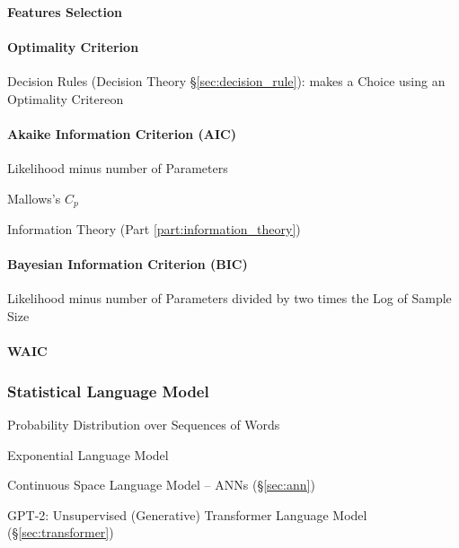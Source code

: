 \paragraph{Features Selection}\label{sec:feature_selection}\hfill

\paragraph{Optimality Criterion}\label{sec:optimality_criterion}\hfill

\fist Decision Rules (Decision Theory \S\ref{sec:decision_rule}): makes a
Choice using an Optimality Critereon



\paragraph{Akaike Information Criterion (AIC)}\label{sec:aic}\hfill

Likelihood minus number of Parameters

Mallows's $C_p$

\fist Information Theory (Part \ref{part:information_theory})



\paragraph{Bayesian Information Criterion (BIC)}\label{sec:bic}\hfill

Likelihood minus number of Parameters divided by two times the Log of Sample
Size



\paragraph{WAIC}\label{sec:waic}\hfill



\subsubsection{Statistical Language Model}
\label{sec:statistical_language_model}

Probability Distribution over Sequences of Words

Exponential Language Model

Continuous Space Language Model -- ANNs (\S\ref{sec:ann})

GPT-2: Unsupervised (Generative) Transformer Language Model
(\S\ref{sec:transformer})



